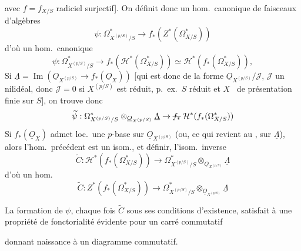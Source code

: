 \documentclass[11pt,a4paper]{article}
\begin{document}

avec $f = f_{X/S}$ radiciel  surjectif].
On définit donc un hom.\ canonique de faisceaux d'algèbres
\[
\psi : \Omega^{*}_{X^{(p/S)}/S} \to f_{*}(Z^{*}(\Omega^{*}_{X/S}))
\]
d'où un hom.\ canonique
\[
\psi : \Omega^{*}_{X^{(p/S)}/S} \to f_{*}(\mathcal{H}^{*}(\Omega^{*}_{X/S})) \simeq \mathcal{H}^{*}(f_{*}(\Omega^{*}_{X/S})) ,
\]
Si $\underline{\Lambda} = \operatorname{Im}(\underline{O}_{X^{(p/S)}} \to f_{*}(\underline{O}_{X}))$ [qui est donc de la forme $\underline{O}_{X^{(p/S)}}/\mathcal{J}$, $\mathcal{J}$ un nilidéal, donc $\mathcal{J} = 0$ si $X^{(p/S)}$ est réduit, p.\ ex.\ $S$ réduit et $X$ \struck{\ill{}} \ de présentation finie sur $S$], on trouve donc
\[
\widetilde{\psi} : \Omega^{*}_{X^{(p/S)}/S} \otimes_{\underline{O}_{X^{(p/S)}}} \underline{\Lambda} \to \text{\struck{$f_{*}$}}\; \mathcal{H}^{*}(f_{*}(\Omega^{*}_{X/S}))
\]
Si $f_{*}(\underline{O}_{X})$ admet loc.\ une $p$-base sur $\underline{O}_{X^{(p/S)}}$ (ou, ce qui revient au , sur $\underline{\Lambda}$), alors l'hom.\ précédent est un isom., et   définir, \struck{\ill{}} l'isom.\ inverse
\[
\widetilde{C} : \mathcal{H}^{*}(f_{*}(\Omega^{*}_{X/S})) \to \Omega^{*}_{X^{(p/S)}/S} \otimes_{\underline{O}_{X^{(p/S)}}} \underline{\Lambda}
\]
d'où un hom.
\[
\widetilde{C} : Z^{*}(f_{*}(\Omega^{*}_{X/S})) \to \Omega^{*}_{X^{(p/S)}/S} \otimes_{\underline{O}_{X^{(p/S)}}} \underline{\Lambda}
\]

La formation de $\psi$, chaque fois $\widetilde{C}$ sous ses conditions d'existence, satisfait à une propriété de fonctorialité évidente pour un carré commutatif


donnant naissance à un diagramme commutatif.
\end{document}
